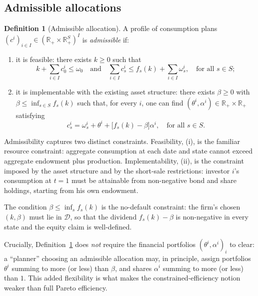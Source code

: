 \documentclass[11pt,a4paper,oneside]{book}
\def\R{\mathbb{R}}
\def\leq{\leqslant}
\def\geq{\geqslant}
\def\et{\quad \text{and} \quad}
\theoremstyle{plain}
\theoremstyle{definition}
\newtheorem{definition}[theorem]{Definition}
\theoremstyle{remark}
\numberwithin{equation}{chapter}
\begin{document}
\subsection{Admissible allocations}

\begin{definition}[Admissible allocation]\label{def:admissible-alloc}
A profile of consumption plans $(c^i)_{i \in I} \in (\R_+ \times \R_+^S)^I$ is \emph{admissible} if:
\begin{enumerate}
  \item[\textup{(i)}] it is feasible: there exists $k \geq 0$ such that
  \begin{equation*}
    k + \sum_{i \in I} c^i_0 \leq \omega_0
    \et
    \sum_{i \in I} c^i_s \leq f_s(k) + \sum_{i \in I} \omega^i_s, \quad \text{for all $s\in S$};
  \end{equation*}
  \item[\textup{(ii)}] it is implementable with the existing asset structure: there exists $\beta \geq 0$ with $\beta \leq \inf_{s\in S} f_s(k)$ such that, for every $i$, one can find $(\theta^i, \alpha^i) \in \R_+ \times \R_+$ satisfying
  \begin{equation*}
    c^i_s = \omega^i_s + \theta^i + \bigl[ f_s(k) - \beta \bigr] \alpha^i, \quad \text{for all $s\in S$}.
  \end{equation*}
\end{enumerate}
\end{definition}

Admissibility captures two distinct constraints.
Feasibility, (i), is the familiar resource constraint: aggregate consumption at each date and state cannot exceed aggregate endowment plus production.
Implementability, (ii), is the constraint imposed by the asset structure and by the short-sale restrictions: investor $i$'s consumption at $t=1$ must be attainable from non-negative bond and share holdings, starting from his own endowment.

The condition $\beta \leq \inf_s f_s(k)$ is the no-default constraint: the firm's chosen $(k, \beta)$ must lie in $\mathcal{D}$, so that the dividend $f_s(k) - \beta$ is non-negative in every state and the equity claim is well-defined.

Crucially, Definition~\ref{def:admissible-alloc} does \emph{not} require the financial portfolios $(\theta^i, \alpha^i)_{i}$ to clear: a ``planner'' choosing an admissible allocation may, in principle, assign portfolios $\theta^i$ summing to more (or less) than $\beta$, and shares $\alpha^i$ summing to more (or less) than $1$.
This added flexibility is what makes the constrained-efficiency notion weaker than full Pareto efficiency.
\end{document}
